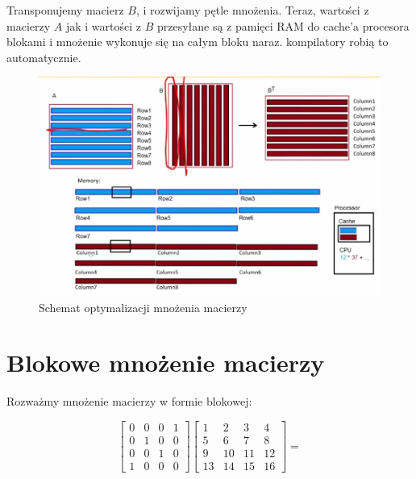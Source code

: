 \documentclass{article}
\begin{document}
Transponujemy macierz \( B \), i rozwijamy pętle mnożenia. Teraz, wartości z macierzy \( A \) jak i wartości z \( B \) przesyłane są z pamięci RAM do cache’a procesora blokami i mnożenie wykonuje się na całym bloku naraz. kompilatory robią to automatycznie.
\begin{figure}[h]
    \centering
    \includegraphics[scale=0.5]{ob1.png}
    \caption{Schemat optymalizacji mnożenia macierzy}
    \label{fig:matrix_mult}
\end{figure}


\section{Blokowe mnożenie macierzy}
Rozważmy mnożenie macierzy w formie blokowej:

\[
\begin{bmatrix}
0 & 0 & 0 & 1 \\
0 & 1 & 0 & 0 \\
0 & 0 & 1 & 0 \\
1 & 0 & 0 & 0
\end{bmatrix}
\begin{bmatrix}
1 & 2 & 3 & 4 \\
5 & 6 & 7 & 8 \\
9 & 10 & 11 & 12 \\
13 & 14 & 15 & 16
\end{bmatrix}
=
\]
\end{document}
